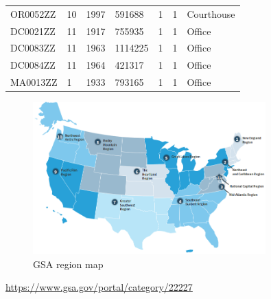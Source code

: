 \documentclass[12pt]{article}
\begin{document}
\begin{longtable}{lllllll}
OR0052ZZ         & 10     & 1997        & 591688                     & 1     & 1            & Courthouse                       \\
DC0021ZZ         & 11     & 1917        & 755935                     & 1     & 1            & Office                           \\
DC0083ZZ         & 11     & 1963        & 1114225                    & 1     & 1            & Office                           \\
DC0084ZZ         & 11     & 1964        & 421317                     & 1     & 1            & Office                           \\
MA0013ZZ         & 1      & 1933        & 793165                     & 1     & 1            & Office                          \\
\hline
\end{longtable}
\FloatBarrier

\begin{figure}[h!]
  \centering
  \includegraphics[width=0.8\textwidth]{images/gsa_region.png}
  \caption{GSA region map}
  \label{fig:gsa_region}
\end{figure}
\FloatBarrier
\url{https://www.gsa.gov/portal/category/22227}
\end{document}
